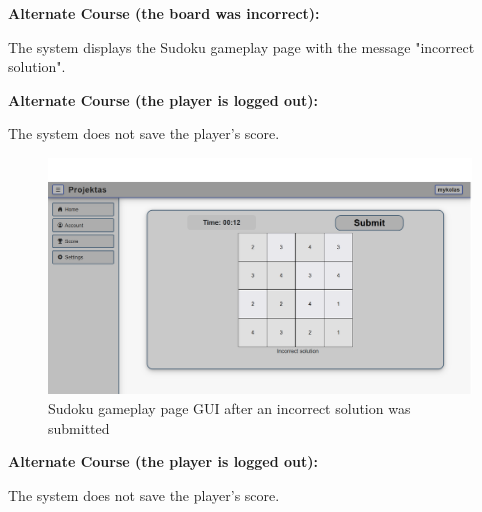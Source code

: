\documentclass[11pt,a4paper]{article}
\newcommand{\heading}[1]{\vspace{1em}\noindent\textbf{#1}\par\vspace{0.5em}}
\begin{document}
\heading{Alternate Course (the board was incorrect):}
The system displays the Sudoku gameplay page with the message "incorrect solution".

\heading{Alternate Course (the player is logged out):}
The system does not save the player's score.

\begin{figure}[H]
    \centering
    \includegraphics[width=1\textwidth,keepaspectratio]{PSI_3rd_trial/PNGs/sudoku_2.png}
    \caption{Sudoku gameplay page GUI after an incorrect solution was submitted}
    \label{fig:sudoku_2}
\end{figure}

\heading{Alternate Course (the player is logged out):}
The system does not save the player's score.
\end{document}
